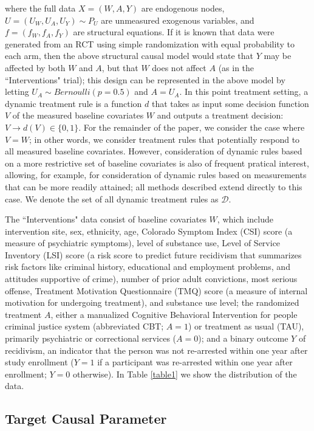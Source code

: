 \documentclass[a4paper,12pt]{article}
\begin{document}
\noindent where the full data $X = (W,A,Y)$ are endogenous nodes, $U = (U_W, U_A, U_Y) \sim P_U$ are unmeasured exogenous variables, and $f = (f_W, f_A, f_Y)$ are structural equations. If it is known that data were generated from an RCT using simple randomization with equal probability to each arm, then the above structural causal model would state that $Y$ may be affected by both $W$ and $A$, but that $W$ does not affect $A$ (as in the ``Interventions" trial); this design can be represented in the above model by letting $U_A \sim Bernoulli(p = 0.5)$ and $A=U_A$. In this point treatment setting, a dynamic treatment rule is a function $d$ that takes as input some decision function $V$ of the measured baseline covariates $W$ and outputs a treatment decision: $V \rightarrow d(V) \in \{0,1\}$. For the remainder of the paper, we consider the case where $V=W$; in other words, we consider treatment rules that potentially respond to all measured baseline covariates. However, consideration of dynamic rules based on a more restrictive set of baseline covariates is also of frequent pratical interest, allowing, for example, for consideration of dynamic rules based on measurements that can be more readily attained; all methods described extend directly to this case. We denote the set of all dynamic treatment rules as $\mathcal{D}$.

The ``Interventions" data consist of baseline covariates $W$, which include intervention site, sex, ethnicity, age, Colorado Symptom Index (CSI) score (a measure of psychiatric symptoms), level of substance use, Level of Service Inventory (LSI) score (a risk score to predict future recidivism that summarizes risk factors like criminal history, educational and employment problems, and attitudes supportive of crime), number of prior adult convictions, most serious offense, Treatment Motivation Questionnaire (TMQ) score (a measure of internal motivation for undergoing treatment), and substance use level; the randomized treatment $A$, either a manualized Cognitive Behavioral Intervention for people criminal justice system (abbreviated CBT; $A=1$) or treatment as usual (TAU), primarily psychiatric or correctional services ($A=0$); and a binary outcome $Y$ of recidivism, an indicator that the person was not re-arrested within one year after study enrollment ($Y=1$ if a participant was re-arrested within one year after enrollment; $Y=0$ otherwise). In Table \ref{table1} we show the distribution of the data.

\subsection{Target Causal Parameter}
\end{document}
